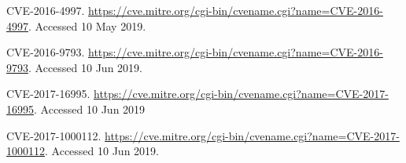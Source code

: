 \documentclass[english,sigrecommended,JIP]{ipsj}
\begin{document}
\begin{thebibliography}{99}
  CVE-2016-4997. \url{https://cve.mitre.org/cgi-bin/cvename.cgi?name=CVE-2016-4997}. Accessed 10 May 2019.
  
  CVE-2016-9793. \url{https://cve.mitre.org/cgi-bin/cvename.cgi?name=CVE-2016-9793}. Accessed 10 Jun 2019.

  CVE-2017-16995. \url{https://cve.mitre.org/cgi-bin/cvename.cgi?name=CVE-2017-16995}. Accessed 10 Jun 2019

  CVE-2017-1000112. \url{https://cve.mitre.org/cgi-bin/cvename.cgi?name=CVE-2017-1000112}. Accessed 10 Jun 2019.
    
  
  






\end{thebibliography}
\end{document}
